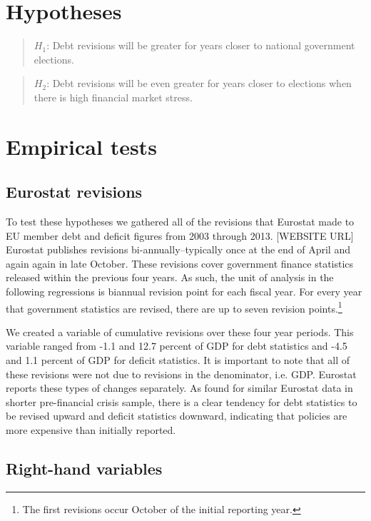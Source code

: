 \documentclass[]{article}
\begin{document}
\section{Hypotheses}

\begin{quote}
    $H_{1}$: Debt revisions will be greater for years closer to national government elections.
\end{quote}

\begin{quote}
    $H_{2}$: Debt revisions will be even greater for years closer to elections when there is high financial market stress.
\end{quote}

\section{Empirical tests}

\subsection{Eurostat revisions}

To test these hypotheses we gathered all of the revisions that Eurostat made to EU member debt and deficit figures from 2003 through 2013. [WEBSITE URL] Eurostat publishes revisions bi-annually--typically once at the end of April and again again in late October. These revisions cover government finance statistics released within the previous four years. As such, the unit of analysis in the following regressions is biannual revision point for each fiscal year. For every year that government statistics are revised, there are up to seven revision points.\footnote{The first revisions occur October of the initial reporting year.}

We created a variable of cumulative revisions over these four year periods. This variable ranged from -1.1 and 12.7 percent of GDP for debt statistics and -4.5 and 1.1 percent of GDP for deficit statistics. It is important to note that all of these revisions were not due to revisions in the denominator, i.e. GDP. Eurostat reports these types of changes separately. As \cite{DeCastro2013} found for similar Eurostat data in shorter pre-financial crisis sample, there is a clear tendency for debt statistics to be revised upward and deficit statistics downward, indicating that policies are more expensive than initially reported.

\subsection{Right-hand variables}
\end{document}
